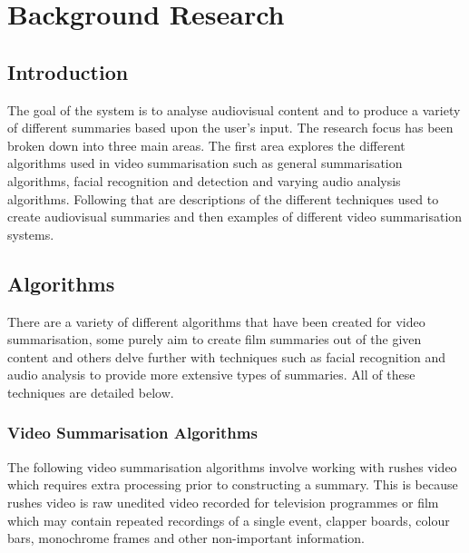 \section{Background Research}


\subsection{Introduction}
The goal of the system is to analyse audiovisual content and to produce a variety of different summaries based upon the user's input. The 
research focus has been broken down into three main areas. The first area explores the different algorithms used in video summarisation such as general summarisation algorithms, facial recognition and detection and varying audio analysis algorithms. Following that are descriptions of the different techniques used to create audiovisual summaries and then examples of different video summarisation systems. 

\subsection{Algorithms}

There are a variety of different algorithms that have been created for video summarisation, some purely aim to create film summaries out of 
the given content and others delve further with techniques such as facial recognition and audio analysis to provide more extensive types of summaries. All of 
these techniques are detailed below. 

\subsubsection{Video Summarisation Algorithms}
\label{sec:Algorithms}
The following video summarisation algorithms involve working with rushes video which requires extra processing prior to constructing a summary. This is because rushes video is raw unedited video recorded for television programmes or film which may contain repeated recordings of a single event, clapper boards, colour bars, monochrome frames and other non-important information.

